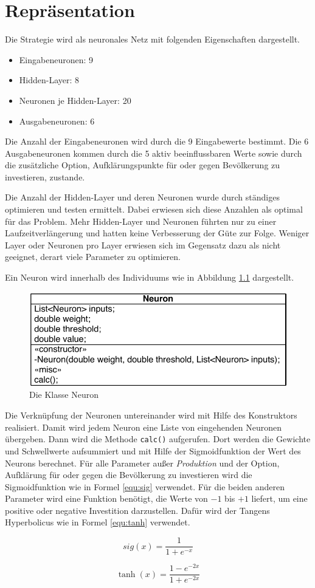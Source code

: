 \chapter{Repräsentation}
Die Strategie wird als neuronales Netz mit folgenden Eigenschaften dargestellt.
\begin{itemize}
\item Eingabeneuronen: 9
\item Hidden-Layer: 8
\item Neuronen je Hidden-Layer: 20
\item Ausgabeneuronen: 6
\end{itemize}

Die Anzahl der Eingabeneuronen wird durch die 9 Eingabewerte bestimmt. Die 6 Ausgabeneuronen kommen durch die 5 aktiv beeinflussbaren Werte sowie durch die zusätzliche Option, Aufklärungspunkte für oder gegen Bevölkerung zu investieren, zustande.

Die Anzahl der Hidden-Layer und deren Neuronen wurde durch ständiges optimieren und testen ermittelt. Dabei erwiesen sich diese Anzahlen als optimal für das Problem. Mehr Hidden-Layer und Neuronen führten nur zu einer Laufzeitverlängerung und hatten keine Verbesserung der Güte zur Folge. Weniger Layer oder Neuronen pro Layer erwiesen sich im Gegensatz dazu als nicht geeignet, derart viele Parameter zu optimieren.

Ein Neuron wird innerhalb des Individuums wie in Abbildung \ref{fig:neuron} dargestellt.

\begin{figure}[tbph]
\centering
\includegraphics[width=0.5\linewidth]{pics/neuron}
\caption[Die Klasse Neuron]{Die Klasse Neuron}
\label{fig:neuron}
\end{figure}

Die Verknüpfung der Neuronen untereinander wird mit Hilfe des Konstruktors realisiert. Damit wird jedem Neuron eine Liste von eingehenden Neuronen übergeben. Dann wird die Methode \verb+calc()+ aufgerufen. Dort werden die Gewichte und Schwellwerte aufsummiert und mit Hilfe der Sigmoidfunktion der Wert des Neurons berechnet. Für alle Parameter außer \emph{Produktion} und der Option, Aufklärung für oder gegen die Bevölkerung zu investieren wird die Sigmoidfunktion wie in Formel \ref{equ:sig} verwendet. Für die beiden anderen Parameter wird eine Funktion benötigt, die Werte von $ -1 $ bis $ +1 $ liefert, um eine positive oder negative Investition darzustellen. Dafür wird der Tangens Hyperbolicus wie in Formel \ref{equ:tanh} verwendet.

\begin{equation}
\label{equ:sig}
sig(x) = \dfrac{1}{1+ e^{-x}}
\end{equation}

\begin{equation}
\label{equ:tanh}
\tanh(x) = \dfrac{1- e^{-2x}}{1+ e^{-2x}}
\end{equation}
